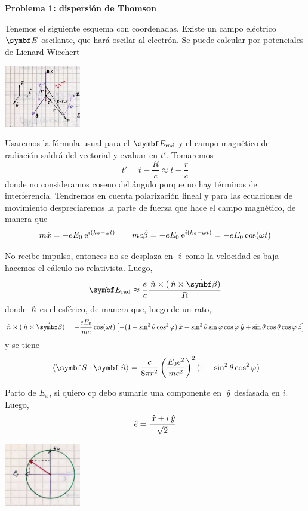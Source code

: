 \documentclass[10pt,oneside]{CBFT_book}
\begin{document}
\begin{ejemplo}{\bf Problema 1: dispersión de Thomson}

Tenemos el siguiente esquema con coordenadas. Existe un campo eléctrico $\vb E$ oscilante, que
hará oscilar al electrón.
Se puede calcular por potenciales de Lienard-Wiechert

\includegraphics[width=0.25\textwidth]{images/fig_ft1_proble_thomson1.jpg}

Usaremos la fórmula usual para el $\vb E_\text{rad}$ y el campo magnético de radiación saldrá
del vectorial y evaluar en $t'$. Tomaremos
\[
	t' = t - \frac R c \approx t - \frac r c
\]
donde no consideramos coseno del ángulo porque no hay términos de interferencia.
Tendremos en cuenta polarización lineal y para las ecuaciones de movimiento despreciaremos la
parte de fuerza que hace el campo magnético, de manera que
\[
	m\ddot{x} = -e E_0 \:\mathrm{e}^{i(kz-\omega t)} \qquad 
	m c \dot{\beta} = -e E_0 \:\mathrm{e}^{i(kz-\omega t)} = -e E_0 \cos(\omega t)
\]

No recibe impulso, entonces no se desplaza en $\:\hat{z}$ como la velocidad es baja hacemos el 
cálculo no relativista. Luego,
\[
	\vb{E}_\text{rad} \approx \frac{e}{c} \frac{\nver \times (\nver \times \dot{\vb{\beta}})}{R}
\]
donde $\:\hat{n}$ es el esférico, de manera que, luego de un rato,
\[
	\nver \times (\nver \times \dot{\vb{\beta}}) =
	-\frac{eE_0}{mc}\cos(\omega t)
	\left[ 
	-( 1 - \sin^2\theta \cos^2\vp )\xver + 
	\sin^2\theta \sin\vp \cos\vp \yver + 
	\sin\theta \cos\theta \cos\vp \zver
	\right]
\]
y se tiene 
\[
	\vm{\pe{S}{\nver}} = \frac{c}{8\pi r^2} \Frac{E_0 e^2}{mc^2}^2( 1 - \sin^2\theta \cos^2\vp )
\]

Parto de $E_x$, si quiero cp debo sumarle una componente en $\:\hat{y}$ desfasada en $i$. Luego,
\[
	\hat{e} = \frac{\:\hat{x} + i\:\hat{y} }{\sqrt{2}}
\]

\includegraphics[width=0.25\textwidth]{images/fig_ft1_proble_thomson2.jpg}
 

\end{ejemplo}
\end{document}

